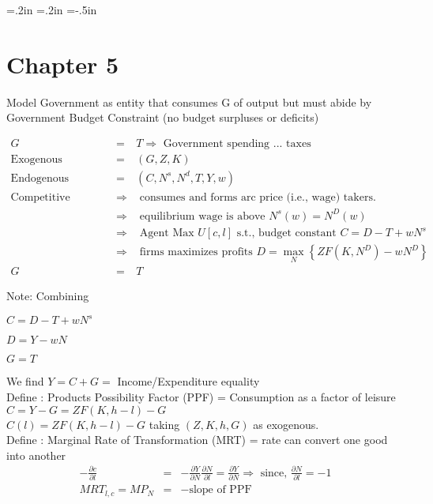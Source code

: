 \oddsidemargin=.2in
\evensidemargin=.2in
\textwidth=6in
\topmargin=-.5in
\textheight=9in
\parindent=0in
\pagestyle{empty}


\section*{Chapter 5}
Model Government as entity that consumes G of output but must abide by Government Budget Constraint (no budget surpluses or deficits)

\begin{eqnarray*}
G &=& T \Longrightarrow \mbox{ Government spending ... taxes }\\
\mbox{Exogenous Variables } &=& (G, Z, K)\\
\mbox{Endogenous Variables } &=& (C, N^s, N^d, T, Y, w)\\
\mbox{Competitive Equilibrium } &\Longrightarrow & \mbox{ consumes and forms arc price (i.e., wage) takers.}\\
&\Longrightarrow & \mbox{ equilibrium wage is above } N^s(w) = N^D(w)\\
&\Longrightarrow & \mbox{ Agent Max } U[c,l ] \mbox{ s.t., budget constant } C = D-T+wN^s\\
&\Longrightarrow & \mbox{ firms maximizes profits } D = \max_{N} \left\{ ZF(K, N^D) - wN^D \right\}\\
G &=& T
\end{eqnarray*}

Note: Combining \begin{list}{*}{}
\item $C = D - T + w N^s$
\item $D = Y - wN$
\item $G = T$
\end{list} 

We find $Y = C + G = $ Income/Expenditure equality\\

Define : Products Possibility Factor (PPF) = Consumption as a factor of leisure\\
$C = Y - G = ZF(K, h-l) - G$\\
$C(l) = ZF(K, h-l) - G$ taking $(Z, K, h, G)$ as exogenous.\\

Define : Marginal Rate of Transformation (MRT) = rate can convert one good into another\\
\begin{eqnarray*}
-\frac{\partial c}{\partial l} &=& -\frac{\partial Y}{\partial N}\frac{\partial N}{\partial l} = \frac{\partial Y}{\partial N} \Rightarrow\mbox{  since, } \frac{\partial N}{\partial l} = -1\\
MRT_{l,c} = MP_N &=& -\mbox{slope of PPF}\\
\end{eqnarray*}


